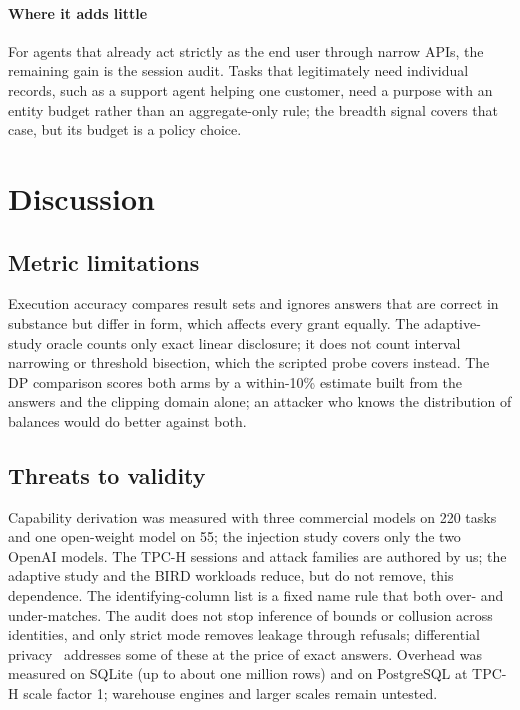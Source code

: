 \documentclass[10pt,journal,compsoc]{IEEEtran}
\begin{document}
\paragraph*{Where it adds little} For agents that already act strictly as the end user through narrow APIs, the remaining gain is the session audit. Tasks that legitimately need individual records, such as a support agent helping one customer, need a purpose with an entity budget rather than an aggregate-only rule; the breadth signal covers that case, but its budget is a policy choice.

\section{Discussion}\label{sec:discussion}

\subsection{Metric limitations}
Execution accuracy compares result sets and ignores answers that are correct in substance but differ in form, which affects every grant equally. The adaptive-study oracle counts only exact linear disclosure; it does not count interval narrowing or threshold bisection, which the scripted probe covers instead. The DP comparison scores both arms by a within-10\% estimate built from the answers and the clipping domain alone; an attacker who knows the distribution of balances would do better against both.

\subsection{Threats to validity}
Capability derivation was measured with three commercial models on 220 tasks and one open-weight model on 55; the injection study covers only the two OpenAI models. The TPC-H sessions and attack families are authored by us; the adaptive study and the BIRD workloads reduce, but do not remove, this dependence. The identifying-column list is a fixed name rule that both over- and under-matches. The audit does not stop inference of bounds or collusion across identities, and only strict mode removes leakage through refusals; differential privacy~\cite{dwork2006calibrating,johnson2018flex} addresses some of these at the price of exact answers. Overhead was measured on SQLite (up to about one million rows) and on PostgreSQL at TPC-H scale factor 1; warehouse engines and larger scales remain untested.
\end{document}
